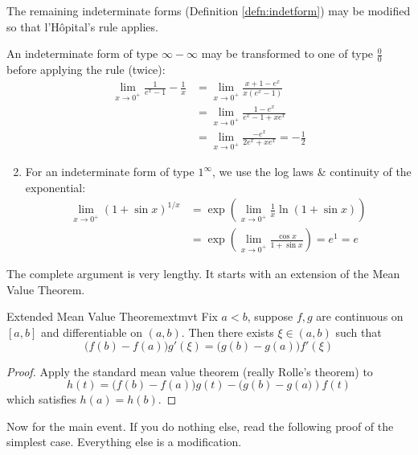 The remaining indeterminate forms (Definition \ref{defn:indetform}) may be modified so that l'Hôpital's rule applies.

\begin{examples}{}{}
	\exstart An indeterminate form of type $\infty-\infty$ may be transformed to one of type $\frac 00$ before applying the rule (twice):
	  \begin{align*}
	  	\lim\limits_{x\to 0^+}\frac 1{e^x-1}-\frac 1x
	  	&=\lim\limits_{x\to 0^+}\frac{x+1-e^x}{x(e^x-1)} \tag{type $\frac 00$}\\
	  	&=\lim\limits_{x\to 0^+}\frac{1-e^x}{e^x-1+xe^x} \tag{still type $\frac 00$}\\
	  	&=\lim\limits_{x\to 0^+}\frac{-e^x}{2e^x+xe^x} =-\frac 12
	  \end{align*}
	  
	\goodbreak
	  
	\begin{enumerate}\setcounter{enumi}{1}
	 	\item For an indeterminate form of type $1^\infty$, we use the log laws \& continuity of the exponential:
	 	\begin{align*}
		 	\lim_{x\to 0^+} (1+\sin x)^{1/x}
		 	&=\exp\left(\lim_{x\to 0^+} \frac 1x\ln(1+\sin x)\right) \tag{type $\frac 00$}\\
		 	&=\exp\left(\lim_{x\to 0^+} \frac{\cos x}{1+\sin x}\right) 
		 	=e^1=e
	 	\end{align*}
 	\end{enumerate}
\end{examples}



The complete argument is very lengthy. It starts with an extension of the Mean Value Theorem.

\begin{lemm}{Extended Mean Value Theorem}{extmvt}
	Fix $a<b$, suppose $f,g$ are continuous on $[a,b]$ and differentiable on $(a,b)$. Then there exists $\xi\in(a,b)$ such that
	\[
		\big(f(b)-f(a)\big)g'(\xi)=\big(g(b)-g(a)\big)f'(\xi)
	\] 
\end{lemm}

\begin{proof}
	Apply the standard mean value theorem (really Rolle's theorem) to
	\[
		h(t)=\bigl(f(b)-f(a)\bigr)g(t)-\bigl(g(b)-g(a\bigr))f(t)
	\]
	which satisfies $h(a)=h(b)$.
\end{proof}


Now for the main event. If you do nothing else, read the following proof of the simplest case. Everything else is a modification.

